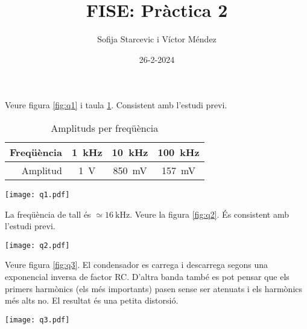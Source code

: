 \documentclass[catalan, a4paper, nobib]{tufte-handout}
\author{Sofija Starcevic i Víctor Méndez}
\title{FISE: Pràctica 2}
\date{26-2-2024}
\begin{document}
\maketitle

 Veure figura \ref{fig:q1} i taula \ref{tab:t1}. Consistent amb l'estudi previ.

\begin{table}
  \begin{center}
    \begin{tabular}{@{}rccc@{}}
      \toprule
      Freqüència & \qty{1}{\kilo\hertz} & \qty{10}{\kilo\hertz} & \qty{100}{\kilo\hertz} \\
      \midrule
      Amplitud & \qty{1}{\volt} & \qty{850}{\milli\volt} & \qty{157}{\milli\volt} \\
      \bottomrule
    \end{tabular}
  \end{center}
  \caption{Amplituds per freqüència}
  \label{tab:t1}
\end{table}

\begin{figure*}
  \begin{center}
    \texttt{[image: q1.pdf]}
    \caption{Les tres sortides dels tres filtres respectius passa-baixes}
    \label{fig:q1}
  \end{center}
\end{figure*}

 La freqüència de tall és $\simeq \qty{16}{\kilo\hertz}$. Veure la figura \ref{fig:q2}. És consistent amb l'estudi previ.

\begin{figure*}
  \begin{center}
    \texttt{[image: q2.pdf]}
    \caption{Funció de transferència filtre passa-baix}
    \label{fig:q2}
  \end{center}
\end{figure*}

 Veure figura \ref{fig:q3}. El condensador es carrega i descarrega segons una exponencial inversa de factor RC. D'altra banda també es pot pensar que els primers harmònics (els més importants) pasen sense ser atenuats i els harmònics més alts no. El resultat és una petita distorsió.

\begin{figure*}
  \begin{center}
    \texttt{[image: q3.pdf]}
    \caption{Resposta d'un circuit RC amb excitació pols cuadrat}
    \label{fig:q3}
  \end{center}
\end{figure*}
\end{document}
